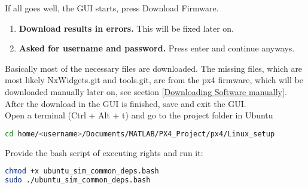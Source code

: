 If all goes well, the GUI starts, press Download Firmware. 
\begin{enumerate}
	\item \textbf{Download results in errors.} This will be fixed later on.
	\item \textbf{Asked for username and password.} Press enter and continue anyways.
\end{enumerate} 
Basically most of the necessary files are downloaded. The missing files, which are most likely NxWidgets.git and tools.git, are from the px4 firmware, which will be downloaded manually later on, see section \ref{Downloading Software manually}. After the download in the GUI is finished, save and exit the GUI.\\
\newline
Open a terminal (Ctrl + Alt + t) and go to the project folder in Ubuntu
\begin{lstlisting}[language=sh]
cd home/<username>/Documents/MATLAB/PX4_Project/px4/Linux_setup
\end{lstlisting}
Provide the bash script of executing rights and run it:
\begin{lstlisting}[language=sh]
chmod +x ubuntu_sim_common_deps.bash
sudo ./ubuntu_sim_common_deps.bash
\end{lstlisting}
